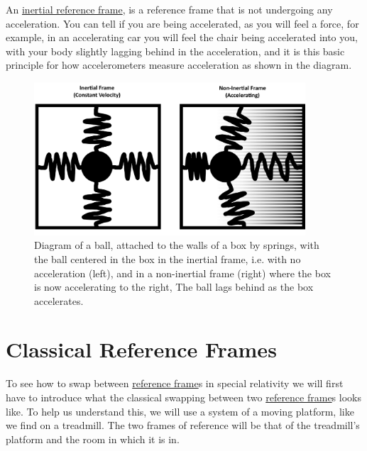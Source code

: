 An \hyperlink{def-Inertial-reference-frame}{inertial reference frame}, is a reference frame that is not undergoing any acceleration. You can tell if you are being accelerated, as you will feel a force, for example, in an accelerating car you will feel the chair being accelerated into you, with your body slightly lagging behind in the acceleration, and it is this basic principle for how accelerometers measure acceleration as shown in the diagram.

\begin{figure}[H]
	\centering
	\includegraphics[width=0.9\textwidth]{images/pdf/Spring_boxes.pdf}
	\caption{Diagram of a ball, attached to the walls of a box by springs, with the ball centered in the box in the inertial frame, i.e. with no acceleration (left), and in a non-inertial frame (right) where the box is now accelerating to the right, The ball lags behind as the box accelerates.}
	\label{fig: spring boxes}
\end{figure}

\section{Classical Reference Frames}

To see how to swap between \hyperlink{def-Reference-frame}{reference frame}s in special relativity we will first have to introduce what the classical swapping between two \hyperlink{def-Reference-frame}{reference frame}s looks like. To help us understand this, we will use a system of a moving platform, like we find on a treadmill. The two frames of reference will be that of the treadmill's platform and the room in which it is in.


